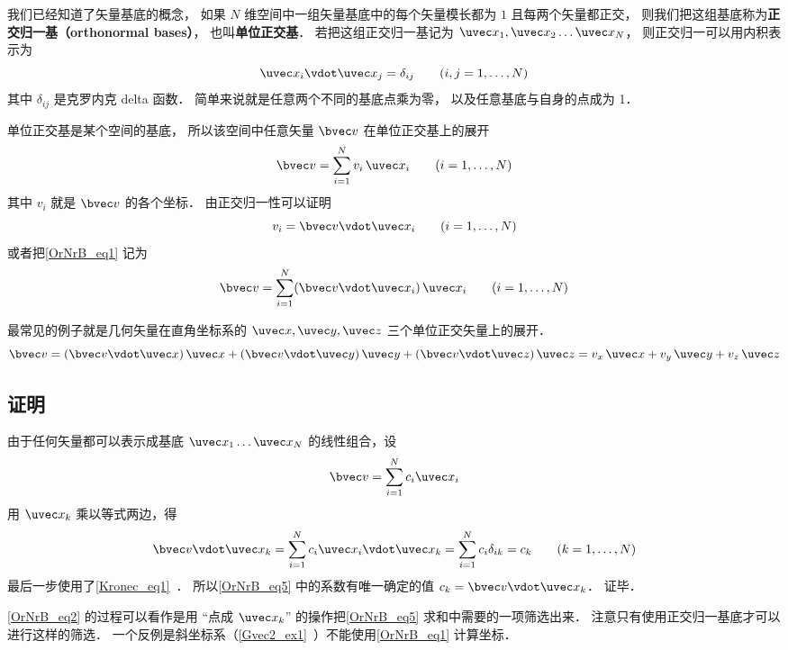 

我们已经知道了矢量基底的概念， 如果 $N$ 维空间中一组矢量基底中的每个矢量模长都为 $1$ 且每两个矢量都正交， 则我们把这组基底称为\textbf{正交归一基（orthonormal bases）}， 也叫\textbf{单位正交基}． 若把这组正交归一基记为 $\uvec x_1,\uvec x_2\dots\uvec x_N$， 则正交归一可以用内积表示为
\begin{equation}\label{OrNrB_eq3}
\uvec x_i \vdot \uvec x_j = \delta_{ij} \qquad (i,j = 1,\dots, N)
\end{equation}
其中 $\delta_{ij}$ 是克罗内克 delta 函数． 简单来说就是任意两个不同的基底点乘为零， 以及任意基底与自身的点成为 1．

单位正交基是某个空间的基底， 所以该空间中任意矢量 $\bvec v$ 在单位正交基上的展开
\begin{equation}\label{OrNrB_eq1}
\bvec v = \sum_{i = 1}^N v_i \,\uvec x_i \qquad (i = 1,\dots, N)
\end{equation}
其中 $v_i$ 就是 $\bvec v$ 的各个坐标． 由正交归一性可以证明
\begin{equation}
v_i = \bvec v\vdot\uvec x_i \qquad (i = 1,\dots, N)
\end{equation}
或者把\autoref{OrNrB_eq1} 记为
\begin{equation}
\bvec v = \sum_{i = 1}^N (\bvec v\vdot\uvec x_i) \,\uvec x_i \qquad (i = 1,\dots, N)
\end{equation}

最常见的例子就是几何矢量在直角坐标系的 $\uvec x, \uvec y, \uvec z$ 三个单位正交矢量上的展开．
\begin{equation}
\bvec v = (\bvec v \vdot \uvec x)\,\uvec x + (\bvec v \vdot \uvec y)\,\uvec y + (\bvec v \vdot \uvec z)\,\uvec z = v_x \,\uvec x + v_y \,\uvec y + v_z \,\uvec z
\end{equation} 

\subsection{证明}
由于任何矢量都可以表示成基底 $\uvec x_1 \dots \uvec x_N$ 的线性组合，设
\begin{equation}\label{OrNrB_eq5}
\bvec v = \sum_{i = 1}^N c_i \uvec x_i
\end{equation} 
用 $\uvec x_k$ 乘以等式两边，得
\begin{equation}\label{OrNrB_eq2}
\bvec v \vdot \uvec x_k = \sum_{i = 1}^N  c_i \uvec x_i \vdot\uvec x_k = \sum_{i = 1}^N c_i \delta_{ik}  = c_k \qquad (k = 1, \dots, N)
\end{equation}
最后一步使用了\autoref{Kronec_eq1}~． 所以\autoref{OrNrB_eq5} 中的系数有唯一确定的值 $c_k = \bvec v \vdot\uvec x_k$． 证毕．

\autoref{OrNrB_eq2} 的过程可以看作是用 “点成 $\uvec x_k$” 的操作把\autoref{OrNrB_eq5} 求和中需要的一项筛选出来． 注意只有使用正交归一基底才可以进行这样的筛选． 一个反例是斜坐标系（\autoref{Gvec2_ex1}~）不能使用\autoref{OrNrB_eq1} 计算坐标．
